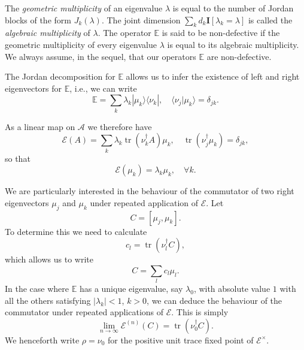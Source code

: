 \documentclass[prl,twocolumn,lengthcheck,superscriptaddress]{revtex4-1}
\newcommand{\tr}{\operatorname{tr}}
\theoremstyle{definition}
\theoremstyle{remark}
\begin{document}
The \emph{geometric multiplicity} of an eigenvalue $\lambda$ is equal to the number of Jordan blocks of the form $J_k(\lambda)$. The joint dimension $\sum_{k} d_k \mathbf{I}[\lambda_k = \lambda] $ is called the \emph{algebraic multiplicity} of $\lambda$. The operator $\mathbb{E}$ is said to be non-defective if the geometric multiplicity of every eigenvalue $\lambda$ is equal to its algebraic multiplicity. We always assume, in the sequel, that our operators $\mathbb{E}$ are non-defective. 

The Jordan decomposition for $\mathbb{E}$ allows us to infer the existence of left and right eigenvectors for $\mathbb{E}$, i.e., we can write
\begin{equation}
	\mathbb{E} = \sum_{k} \lambda_k |\mu_k\rangle \langle \nu_k|, \quad \langle \nu_j|\mu_k\rangle = \delta_{jk}.
\end{equation}

As a linear map on $\mathcal{A}$ we therefore have
\begin{equation}
	\mathcal{E}(A) = \sum_{k} \lambda_k \tr(\nu_k^\dag A)\mu_k, \quad \tr(\nu_j^\dag \mu_k) = \delta_{jk},
\end{equation}
so that
\begin{equation}
	\mathcal{E}(\mu_k) = \lambda_k \mu_k, \quad \forall k.
\end{equation}

We are particularly interested in the behaviour of the commutator of two right eigenvectors $\mu_j$ and $\mu_k$ under repeated application of $\mathcal{E}$. Let 
\begin{equation}
	C = [\mu_j, \mu_k].
\end{equation}
To determine this we need to calculate
\begin{equation}
	c_l = \tr(\nu^\dag_l C),
\end{equation}
which allows us to write
\begin{equation}
	C = \sum_{l} c_l \mu_l.
\end{equation}
In the case where $\mathbb{E}$ has a unique eigenvalue, say $\lambda_0$, with absolute value $1$ with all the others satisfying $|\lambda_k| < 1$, $k > 0$, we can deduce the behaviour of the commutator under repeated applications of $\mathcal{E}$. This is simply 
\begin{equation}
	\lim_{n\rightarrow \infty}\mathcal{E}^{(n)}(C) = \tr(\nu_0^\dag C).
\end{equation}
We henceforth write $\rho = \nu_0$ for the positive unit trace fixed point of $\mathcal{E}^\times$.
\end{document}
